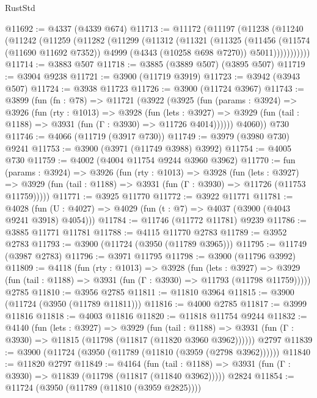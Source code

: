 \begin{lexlean}{RustStd}
\begin{coremodule}
@11692 := @4337 (@4339 @674)
@11713 := @11172
    (@11197
      (@11238
        (@11240
          (@11242
            (@11259
              (@11282
                (@11299
                  (@11312
                    (@11321
                      (@11325
                        (@11456
                          (@11574 (@11690 @11692 @7352))
                          @4999
                          (@4343 (@10258 @698 @7270))
                          @5011)))))))))))
@11714 := @3883 @507
@11718 := @3885 (@3889 @507) (@3895 @507)
@11719 := @3904 @9238
@11721 := @3900 (@11719 @3919)
@11723 := @3942 (@3943 @507)
@11724 := @3938 @11723
@11726 := @3900 (@11724 @3967)
@11743 := @3899
    (fun (fn : @78) =>
    @11721
      (@3922
        (@3925
          (fun (params : @3924) =>
          @3926
            (fun (rty : @1013) =>
            @3928
              (fun (lets : @3927) =>
              @3929 (fun (tail : @1188) => @3931 (fun (Γ : @3930) => @11726 @4014))))))
        @4060))
    @730
@11746 := @4066 (@11719 (@3917 @730))
@11749 := @3979 (@3980 @730) @9241
@11753 := @3900 (@3971 (@11749 @3988) @3992)
@11754 := @4005 @730
@11759 := @4002 (@4004 @11754 @9244 @3960 @3962)
@11770 := fun (params : @3924) =>
  @3926
    (fun (rty : @1013) =>
    @3928
      (fun (lets : @3927) =>
      @3929 (fun (tail : @1188) => @3931 (fun (Γ : @3930) => @11726 (@11753 @11759)))))
@11771 := @3925 @11770
@11772 := @3922 @11771
@11781 := @4028 (fun (U : @4027) => @4029 (fun (t : @7) => @4037 (@3900 (@4043 @9241 @3918) @4054)))
@11784 := @11746 (@11772 @11781) @9239
@11786 := @3885 @11771 @11781
@11788 := @4115 @11770 @2783
@11789 := @3952 @2783
@11793 := @3900 (@11724 (@3950 (@11789 @3965)))
@11795 := @11749 (@3987 @2783)
@11796 := @3971 @11795
@11798 := @3900 (@11796 @3992)
@11809 := @4118
    (fun (rty : @1013) =>
    @3928
      (fun (lets : @3927) =>
      @3929 (fun (tail : @1188) => @3931 (fun (Γ : @3930) => @11793 (@11798 @11759)))))
    @2785
@11810 := @3956 @2785
@11811 := @11810 @3964
@11815 := @3900 (@11724 (@3950 (@11789 @11811)))
@11816 := @4000 @2785
@11817 := @3999 @11816
@11818 := @4003 @11816
@11820 := @11818 @11754 @9244
@11832 := @4140
    (fun (lets : @3927) =>
    @3929
      (fun (tail : @1188) =>
      @3931 (fun (Γ : @3930) => @11815 (@11798 (@11817 (@11820 @3960 @3962))))))
    @2797
@11839 := @3900 (@11724 (@3950 (@11789 (@11810 (@3959 (@2798 @3962))))))
@11840 := @11820 @2797
@11849 := @4164
    (fun (tail : @1188) => @3931 (fun (Γ : @3930) => @11839 (@11798 (@11817 (@11840 @3962)))))
    @2824
@11854 := @11724 (@3950 (@11789 (@11810 (@3959 @2825))))

\end{coremodule}
\end{lexlean}
